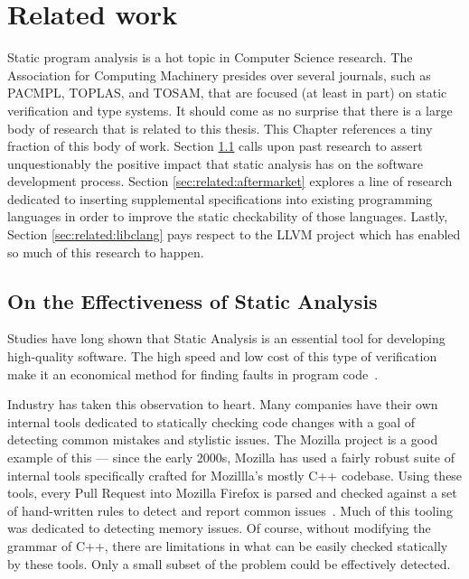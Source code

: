 \chapter{Related work}\label{sec:related}

Static program analysis is a hot topic in Computer Science research.  The Association for Computing Machinery presides over several journals, such as PACMPL, TOPLAS, and TOSAM, that are focused (at least in part) on static verification and type systems.  It should come as no surprise that there is a large body of research that is related to this thesis.  This Chapter references a tiny fraction of this body of work.  Section \ref{sec:related:effectiveness} calls upon past research to assert unquestionably the positive impact that static analysis has on the software development process.  Section \ref{sec:related:aftermarket} explores a line of research dedicated to inserting supplemental specifications into existing programming languages in order to improve the static checkability of those languages.  Lastly, Section \ref{sec:related:libclang} pays respect to the LLVM project which has enabled so much of this research to happen.

\section{On the Effectiveness of Static Analysis}\label{sec:related:effectiveness}

Studies have long shown that Static Analysis is an essential tool for developing high-quality software.  The high speed and low cost of this type of verification make it an economical method for finding faults in program code~\cite{staticanal, static-anal-experience}.  

Industry has taken this observation to heart.  Many companies have their own internal tools dedicated to statically checking code changes with a goal of detecting common mistakes and stylistic issues.  The Mozilla project is a good example of this --- since the early 2000s, Mozilla has used a fairly robust suite of internal tools specifically crafted for Mozillla's mostly C++ codebase.  Using these tools, every Pull Request into Mozilla Firefox is parsed and checked against a set of hand-written rules to detect and report common issues~\cite{mozilla-pork-blog, moz-wiki-static-anal}.  Much of this tooling was dedicated to detecting memory issues.  Of course, without modifying the grammar of C++, there are limitations in what can be easily checked statically by these tools.  Only a small subset of the problem could be effectively detected.  

